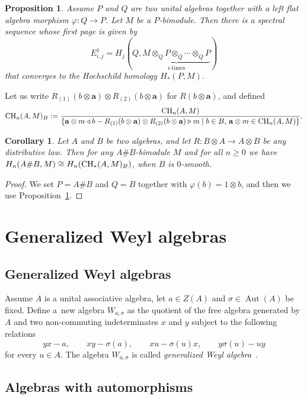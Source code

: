 \documentclass[pdftex]{sigma}
\newcommand{\CH}{{\rm CH}}
\renewcommand{\geq}{\geqslant}
\numberwithin{equation}{section}
\newtheorem{Corollary}[Theorem]{Corollary}
\newtheorem{Proposition}[Theorem]{Proposition}
 { \theoremstyle{definition}
\newtheorem{Definition}[Theorem]{Definition}
\newtheorem{Example}[Theorem]{Example}
\newtheorem{Remark}[Theorem]{Remark} }
\begin{document}
\begin{Proposition}\label{base2}
 Assume $P$ and $Q$ are two unital algebras together with a left flat algebra morphism
 $\varphi \colon Q \to P$. Let $M$ be a $P$-bimodule. Then there is a spectral sequence
 whose first page is given by
 \[ E^1_{i,j}
 = H_j(Q, \underbrace{M\otimes_Q P\otimes_Q \cdots\otimes_Q P}_{\text{$i$-times}})
 \] that converges to the Hochschild homology $H_*(P, M)$.
\end{Proposition}
Let us write $R_{(1)}(b\otimes\mathbf{a})\otimes R_{(2)}(b\otimes\mathbf{a})$ for
$R(b\otimes \mathbf{a})$, and defined
\[ \CH_n(A,M)_B := \frac{\CH_n(A,M)}{\{\mathbf{a}\otimes m\triangleleft b -
 R_{(1)}(b\otimes\mathbf{a})\otimes R_{(2)}(b\otimes\mathbf{a})\triangleright m \mid b\in B,\,\mathbf{a}\otimes m\in
 \CH_n(A,M)\}}.
\]
\begin{Corollary}\label{base3}
 Let $A$ and $B$ be two algebras, and let $R\colon B \otimes A \to A\otimes B$ be any
 distributive law. Then for any $A\# B$-bimodule $M$ and for all $n \geq 0$ we have
$
 H_n (A\# B, M) \cong H_n(\CH_*(A, M)_B)$,
 when $B$ is $0$-smooth.
\end{Corollary}

\begin{proof}
 We set $P=A\# B$ and $Q=B$ together with $\varphi(b) = 1\otimes b$, and then we use
 Proposition~\ref{base2}.
\end{proof}

\section{Generalized Weyl algebras}\label{sect:GWAs}

\subsection{Generalized Weyl algebras}

Assume $A$ is a unital associative algebra, let $a\in Z(A)$ and $\sigma\in \operatorname{Aut}(A)$ be fixed.
Define a~new algebra $W_{a,\sigma}$ as the quotient of the free algebra generated by $A$ and
two non-commuting indeterminates $x$ and $y$ subject to the following relations
\[%
 yx-a,\qquad xy-\sigma(a),\qquad xu-\sigma(u)x,\qquad y\sigma(u)-uy
\]
 for every $u\in A$. The algebra $W_{a,\sigma}$ is called \emph{generalized
 Weyl algebra}~\cite{Bavula:GWAI, BavulaJordan:IsoProblem}.

\subsection{Algebras with automorphisms}
\end{document}
